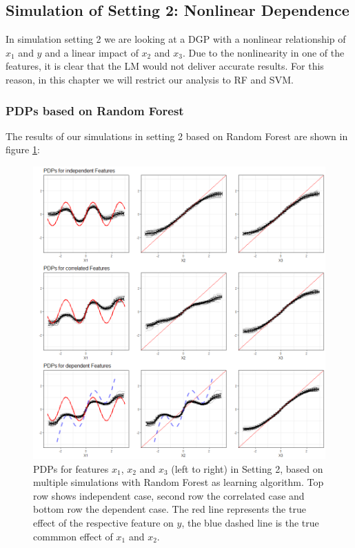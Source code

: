 \documentclass[
]{krantz}
\begin{document}
\hypertarget{simulation-of-setting-2-nonlinear-dependence}{%
\subsection{Simulation of Setting 2: Nonlinear Dependence}\label{simulation-of-setting-2-nonlinear-dependence}}

In simulation setting 2 we are looking at a DGP with a nonlinear relationship of \(x_1\) and \(y\) and a linear impact of \(x_2\) and \(x_3\). Due to the nonlinearity in one of the features, it is clear that the LM would not deliver accurate results. For this reason, in this chapter we will restrict our analysis to RF and SVM.

\hypertarget{pdps-based-on-random-forest-1}{%
\subsubsection{PDPs based on Random Forest}\label{pdps-based-on-random-forest-1}}

The results of our simulations in setting 2 based on Random Forest are shown in figure \ref{fig:Figure17}:

\begin{figure}

\includegraphics[width=1\linewidth]{images/VK_PDP_17_Set2_RF} \hfill{}

\caption{PDPs for features $x_1$, $x_2$ and $x_3$ (left to right) in Setting 2, based on multiple simulations with Random Forest as learning algorithm. Top row shows independent case, second row the correlated case and bottom row the dependent case. The red line represents the true effect of the respective feature on $y$, the blue dashed line is the true commmon effect of $x_1$ and $x_2$.}\label{fig:Figure17}
\end{figure}
\end{document}
